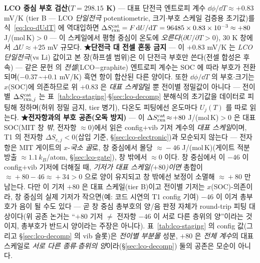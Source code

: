 \begin{verifybox}
\textbf{LCO 중심 부호 검산($T=298.15$ K)} --- 대표 단전극 엔트로피 계수 $\dd\phi/\dd T\approx+0.83$ mV/K\cite{swiderska2019}
(tier B --- LCO \emph{단일전극} potentiometric, 크기$\cdot$부호 스케일 검증용 초기값)를 식~\eqref{eq:lco-dUdT}
에 역대입하면 $\Delta S_{\mathrm{rxn}}^\mathrm{cat}=F\,\mathrm{d} U/\mathrm{d} T=96485\times0.83\times10^{-3}\approx+80$ J/(mol\,K)$>0$ ---
이 스케일에서 평형 중심이 온도에 \emph{오른다}($\partial U/\partial T>0$), $30$ K 창에서 $\Delta U\approx+25$ mV 규모다.
\textbf{★단전극 대 전셀 혼동 금지} --- 이 $+0.83$ mV/K 는 \emph{LCO 단일전극}(vs Li) 값이고 본 장(하프셀
범위)은 이 단전극 부호만 쓴다(전셀 합성은 후속) --- 같은 문헌\cite{swiderska2019} 의 \emph{전셀}(LCO$-$graphite) 엔트로피 계수는
SOC 에 따라 부호가 전환되며($-0.37$\,\textasciitilde$+0.1$ mV/K) 흑연 항이 합산된 다른 양이다. 또한
$\dd\phi/\dd T$ 의 부호$\cdot$크기는 $x$(SOC)에 의존하므로 위 $+0.83$ 은 \emph{대표 스케일}일 뿐 전이별
정밀값이 아니다 --- 전이별 $\Delta S_{\mathrm{rxn},j}^\mathrm{cat}$ 는 표~\ref{tab:lco-staging}$\cdot$\S\ref{sec:lco-decomp}
분해식의 초기값을 데이터로 피팅해 정하며(허위 정밀 금지, tier 병기), 다온도 피팅에선 온도마다 $U_j(T)$ 를 따로 읽는다.
\textbf{★전자항과의 부호 공존(오독 방지)} --- 이 $\Delta S_{\mathrm{rxn}}^\mathrm{cat}\!\approx\!+80$ J/(mol\,K)$>0$ 은
대표 SOC(MIT 창 \emph{밖}, 전자항 $\approx\!0$)에서 읽은 config$+$vib 기저 계수의 \emph{대표 스케일}이며,
T1 의 전자항 $\Delta S_{e,j}<0$(삽입 기준, \S\ref{sec:lco-electronic})과 모순되지 않는다 --- 전자항은 MIT 게이트의
$x$-\emph{국소 골}로, 창 중심에서 몰당 $\approx\!-46$ J/(mol\,K)(게이트 적분 방출 $\approx\!1.1\,k_B$/atom,
\S\ref{sec:lco-gate}), 창 밖에서 $\approx\!0$ 이다. 창 중심에서 이 $-46$ 이 config$+$vib 기저에 더해질 때, \emph{기저가 대표 스케일($+80$)이면} 총합이 $\approx\!+80-46\approx\!+34>0$ 으로
양이 유지되고 창 밖에선 보정이 소멸해 $\approx\!+80$ 만 남는다. 다만 이 기저 $+80$ 은 대표 스케일(tier B)이고
전이별 기저는 $x$(SOC)-의존이라, 창 중심의 실제 기저가 작으면(예: 코드 시연의 T1 config 기여) $-46$ 이 이겨 총부호가
음이 될 수도 있다 --- 곧 창 중심 총부호의 양/음 판정 자체가 round-trip 피팅 대상이다(위 공존 논거는 ``$+80$
기저 $\ne$ 전자항 $-46$ 이 서로 다른 층위의 양''이라는 것이지, 총부호가 반드시 양이라는 주장은 아니다). 표~\ref{tab:lco-staging}
의 config 값(그리고 \S\ref{sec:lco-decomp} 의 vib 슬롯)은 \emph{전이별 부분몰} 성분, $+80$ 은 \emph{전체 계수}의 대표 스케일로 \emph{서로 다른
종류$\cdot$층위의 양}이라(\S\ref{sec:lco-decomp}) 둘의 공존은 모순이 아니다.
\end{verifybox}

